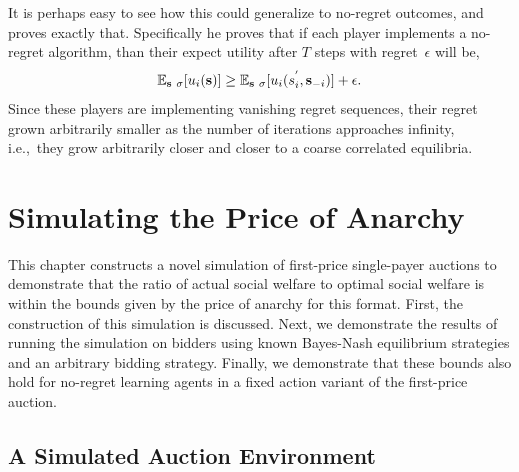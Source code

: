 \documentclass[12pt,twoside]{reedthesis}
\begin{document}
It is perhaps easy to see how this could generalize to no-regret outcomes, and \cite{Roughgarden2016} proves exactly that. Specifically he proves that if each player implements a no-regret algorithm, than their expect utility after $T$ steps with regret~$\epsilon$ will be,
$$ \mathbb{E}_{\textbf{s} ~ \sigma}[u_i(\textbf{s})] \geq \mathbb{E}_{\textbf{s} ~ \sigma}[u_i(s_i^{'}, \textbf{s}_{-i})] + \epsilon.$$
Since these players are implementing vanishing regret sequences, their regret grown arbitrarily smaller as the number of iterations approaches infinity, i.e.,~they grow arbitrarily closer and closer to a coarse correlated equilibria. 



\chapter{Simulating the Price of Anarchy}

This chapter constructs a novel simulation of first-price single-payer auctions to demonstrate that the ratio of actual social welfare to optimal social welfare is within the bounds given by the price of anarchy for this format. First, the construction of this simulation is discussed. Next, we demonstrate the results of running the simulation on bidders using known Bayes-Nash equilibrium strategies and an arbitrary bidding strategy. Finally, we demonstrate that these bounds also hold for no-regret learning agents in a fixed action variant of the first-price auction.

\section{A Simulated Auction Environment}
\end{document}
